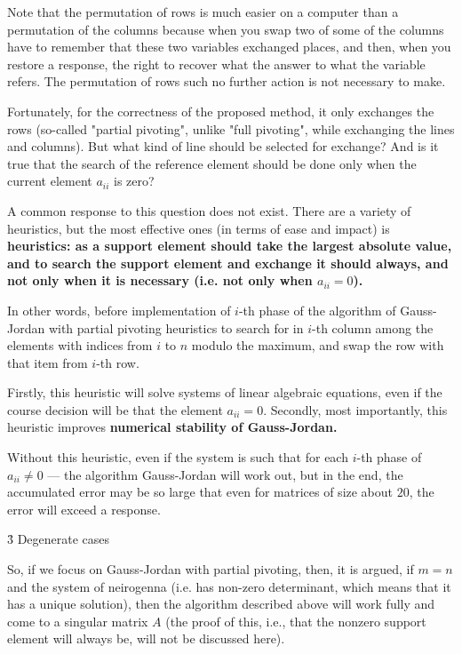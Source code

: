 Note that the permutation of rows is much easier on a computer than a permutation of the columns because when you swap two of some of the columns have to remember that these two variables exchanged places, and then, when you restore a response, the right to recover what the answer to what the variable refers. The permutation of rows such no further action is not necessary to make.

Fortunately, for the correctness of the proposed method, it only exchanges the rows (so-called "partial pivoting", unlike "full pivoting", while exchanging the lines and columns). But what kind of line should be selected for exchange? And is it true that the search of the reference element should be done only when the current element $a_{ii}$ is zero?

A common response to this question does not exist. There are a variety of heuristics, but the most effective ones (in terms of ease and impact) is \bf{heuristics}: as a support element should take the largest absolute value, and to search the support element and exchange it should \bf{always}, and not only when it is necessary (i.e. not only when $a_{ii}=0$).

In other words, before implementation of $i$-th phase of the algorithm of Gauss-Jordan with partial pivoting heuristics to search for in $i$-th column among the elements with indices from $i$ to $n$ modulo the maximum, and swap the row with that item from $i$-th row.

Firstly, this heuristic will solve systems of linear algebraic equations, even if the course decision will be that the element $a_{ii}=0$. Secondly, most importantly, this heuristic improves \bf{numerical stability} of Gauss-Jordan.

Without this heuristic, even if the system is such that for each $i$-th phase of $a_{ii} \ne 0$ --- the algorithm Gauss-Jordan will work out, but in the end, the accumulated error may be so large that even for matrices of size about $20$, the error will exceed a response.


\h3{ Degenerate cases }

So, if we focus on Gauss-Jordan with partial pivoting, then, it is argued, if $m=n$ and the system of neirogenna (i.e. has non-zero determinant, which means that it has a unique solution), then the algorithm described above will work fully and come to a singular matrix $A$ (the proof of this, i.e., that the nonzero support element will always be, will not be discussed here).

